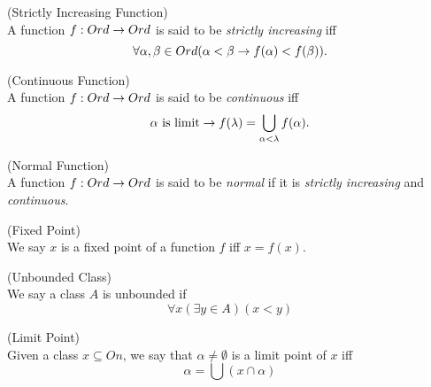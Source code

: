 \begin{definition}{(Strictly Increasing Function)}\label{def:increasing_function}\\
A function $f: Ord \rightarrow Ord$ is said to be \emph{strictly increasing} iff
\begin{equation}
\forall \alpha, \beta \in Ord (\alpha < \beta \rightarrow f(\alpha) < f(\beta)).
\end{equation}
\end{definition}

\begin{definition}{(Continuous Function)}\label{def:continuous_function}\\
A function $f: Ord \rightarrow Ord$ is said to be \emph{continuous} iff
\begin{equation}
\alpha\mbox{ is limit} \rightarrow f(\lambda) = \bigcup_{\alpha < \lambda} f(\alpha).
\end{equation}
\end{definition}

\begin{definition}{(Normal Function)}\label{def:normal_function}\\
A function $f: Ord \rightarrow Ord$ is said to be \emph{normal} if it is \emph{strictly increasing} and \emph{continuous}.
\end{definition}

\begin{definition}{(Fixed Point)}\label{def:fixed_point}\\
We say $x$ is a fixed point of a function $f$ iff $x=f(x)$.
\end{definition}

\begin{definition}{(Unbounded Class)}\label{def:unbounded_class}\\
We say a class $A$ is unbounded if 
\begin{equation}
\forall x (\exists y \in A) (x < y)
\end{equation}
\end{definition}

\begin{definition}{(Limit Point)}\label{def:limit_point}\\
Given a class $x \subseteq On$, we say that $\alpha \neq \emptyset$ is a limit point of $x$ iff 
\begin{equation}
\alpha = \bigcup(x \cap \alpha)
\end{equation}
\end{definition}


